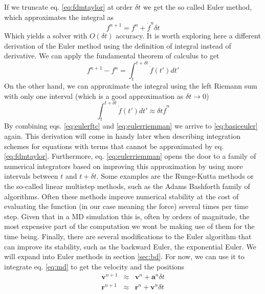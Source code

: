 \documentclass[ twoside,openright,titlepage,numbers=noenddot,%
headinclude,footinclude,cleardoublepage=empty,abstract=on,
BCOR=5mm,paper=a4,fontsize=11pt, dvipsnames
]{scrreprt}
\renewcommand{\vec}[1]{\bm{#1}}
\newcommand{\dt}{\delta t}
\begin{document}
If we truncate eq. \eqref{eq:fdmtaylor} at order $\dt$ we get the so called Euler method\cite{euler}, which approximates the integral as
\begin{equation}
  \label{eq:basiceuler}
  f^{n+1} = f^n + \dot{f}^n\dt
\end{equation}
Which yields a solver with $O(\dt)$ accuracy\cite{euleraccuracy}.
It is worth exploring here a different derivation of the Euler method using the definition of integral instead of derivative. We can apply the fundamental theorem of calculus to get
\begin{equation}
  \label{eq:eulerftc}
  f^{n+1} - f^n = \int_t^{t+\dt}\dot{f}(t')dt'
\end{equation}
On the other hand, we can approximate the integral using the left Riemann sum with only one interval (which is a good approximation as $\dt\rightarrow 0$)
\begin{equation}
  \label{eq:eulerriemman}
  \int_t^{t+\dt}\dot{f}(t')dt' \approx \dt \dot{f}^n
\end{equation}
By combining eqs. \eqref{eq:eulerftc} and \eqref{eq:eulerriemman} we arrive to \eqref{eq:basiceuler} again.
This derivation will come in handy later when describing integration schemes for equations with terms that cannot be approximated by eq. \eqref{eq:fdmtaylor}.
Furthermore, eq. \eqref{eq:eulerriemman} opens the door to a family of numerical integrators based on improving this approximation by using more intervals between $t$ and $t+\dt$. Some examples are the Runge-Kutta methods\cite{rk4} or the so-called linear multistep methods, such as the Adams Bashforth\cite{adamsbashforth} family of algorithms.
Often these methods improve numerical stability at the cost of evaluating the function (in our case meaning the force) several times per time step. Given that in a \gls{MD} simulation this is, often by orders of magnitude, the most expensive part of the computation we wont be making use of them for the time being.
Finally, there are several modifications to the Euler algorithm that can improve its stability, such as the backward Euler\cite{backwardeuler}, the exponential Euler\cite{exponentialEuler}.
We will expand into Euler methods in section \ref{sec:bd}.
For now, we can use it to integrate eq. \eqref{eq:md} to get the velocity and the positions
\begin{equation}
  \label{eq:basiceulermd}
  \begin{aligned}
  \vec{v}^{n+1} &\approx& \vec{v}^n + \vec{a}^n\dt\\
  \vec{r}^{n+1} &\approx& \vec{r}^n + \vec{v}^n\dt
\end{aligned}
\end{equation}
\end{document}

